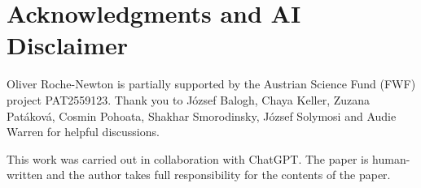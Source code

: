 \documentclass[11pt]{amsart}
\theoremstyle{remark}
\begin{document}
\section*{Acknowledgments and AI Disclaimer} Oliver Roche-Newton is partially supported by the Austrian Science Fund (FWF) project PAT2559123. Thank you to J\'{o}zsef Balogh, Chaya Keller, Zuzana Pat\'akov\'a, Cosmin Pohoata, Shakhar Smorodinsky, J\'{o}zsef Solymosi and Audie Warren for helpful discussions.

This work was carried out in collaboration with ChatGPT. The paper is human-written and the author takes full responsibility for the contents of the paper.



\end{document}
